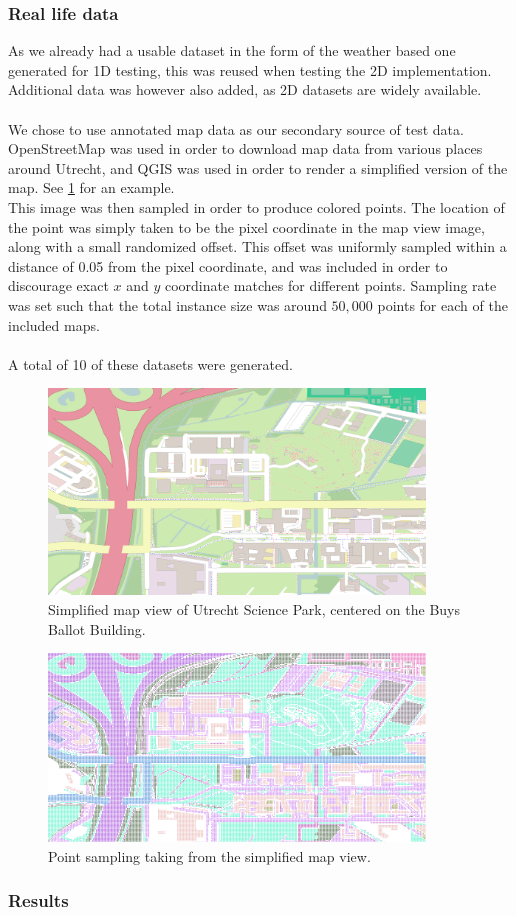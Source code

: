 \documentclass{article}
\begin{document}
\subsubsection*{Real life data}
As we already had a usable dataset in the form of the weather based one generated for 1D testing, this was reused when testing the 2D implementation. Additional data was however also added, as 2D datasets are widely available. \\\\
We chose to use annotated map data as our secondary source of test data. OpenStreetMap \cite{OpenStreetMap} was used in order to download map data from various places around Utrecht, and QGIS \cite{QGIS_software} was used in order to render a simplified version of the map. See \ref{fig:uithof} for an example. \\
This image was then sampled in order to produce colored points. The location of the point was simply taken to be the pixel coordinate in the map view image, along with a small randomized offset. This offset was uniformly sampled within a distance of 0.05 from the pixel coordinate, and was included in order to discourage exact $x$ and $y$ coordinate matches for different points. Sampling rate was set such that the total instance size was around $50,000$ points for each of the included maps. \\\\
A total of 10 of these datasets were generated.

\begin{figure}
    \centering
    \includegraphics[width=10cm]{figs/usp.png}
    \caption{Simplified map view of Utrecht Science Park, centered on the Buys Ballot Building.}
    \label{fig:uithof}
\end{figure}

\begin{figure}
    \centering
    \includegraphics[width=10cm]{figs/usp_points.png}
    \caption{Point sampling taking from the simplified map view.}
    \label{fig:uithof-points}
\end{figure}

\subsubsection*{Results}




\printbibliography
\end{document}
